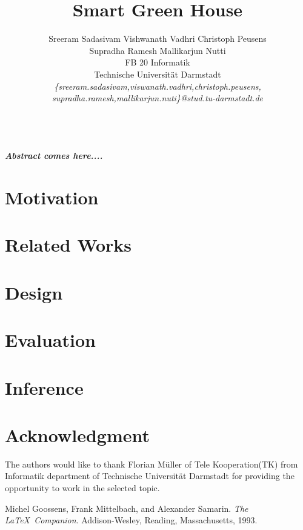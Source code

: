\documentclass[10pt]{article}
\begin{document}
\title{\textbf{Smart Green House}}
\author{
\quad Sreeram Sadasivam \quad Vishwanath Vadhri \quad Christoph Peusens\\
\quad Supradha Ramesh \quad Mallikarjun Nutti\\
FB 20 Informatik\\
Technische Universität Darmstadt\\
\emph{\{sreeram.sadasivam,viswanath.vadhri,christoph.peusens,}\\
\emph{supradha.ramesh,mallikarjun.nuti\}@stud.tu-darmstadt.de}\\
\date{}
}
\maketitle
\textbf{\abstractname{
\emph {\textbf{\\
Abstract comes here....}}}}

\section{Motivation}


\section{Related Works}



\section{Design}


\section{Evaluation}


\section{Inference}


\section*{Acknowledgment}

The authors would like to thank Florian Müller of Tele Kooperation(TK) from Informatik department of Technische Universität Darmstadt for providing the opportunity to work in the selected topic.


\begin{thebibliography}{9}
Michel Goossens, Frank Mittelbach, and Alexander Samarin. 
\textit{The \LaTeX\ Companion}. 
Addison-Wesley, Reading, Massachusetts, 1993.
 
\end{thebibliography}
\end{document}
